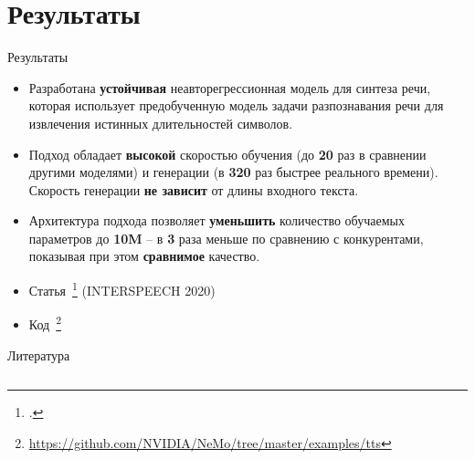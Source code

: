 \section{Результаты}

\begin{frame}{Результаты}
\begin{itemize}
    \item Разработана \textbf{устойчивая} неавторегрессионная модель для синтеза речи, которая использует предобученную модель задачи разпознавания речи для извлечения истинных длительностей символов.
    \item Подход обладает \textbf{высокой} скоростью обучения (до \textbf{20} раз в сравнении другими моделями) и генерации (в \textbf{320} раз быстрее реального времени). Скорость генерации \textbf{не зависит} от длины входного текста.
    \item Архитектура подхода позволяет \textbf{уменьшить} количество обучаемых параметров до \textbf{10M} -- в \textbf{3} раза меньше по сравнению с конкурентами, показывая при этом \textbf{сравнимое} качество.
    \item \renewcommand{\thefootnote}{6}Статья~\footcite{beliaev2020talknet} (INTERSPEECH 2020)
    \item \renewcommand{\thefootnote}{7}Код~\footnote{\url{https://github.com/NVIDIA/NeMo/tree/master/examples/tts}}
\end{itemize}
\end{frame}

\begin{frame}{Литература}
\begin{columns}
\column{0.8\paperwidth}
\printbibliography[heading=none]
\end{columns}
\end{frame}

